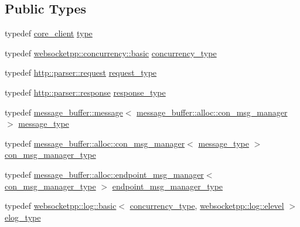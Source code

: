 \subsection*{Public Types}
\begin{DoxyCompactItemize}
\item 
typedef \hyperlink{structwebsocketpp_1_1config_1_1core__client}{core\+\_\+client} \hyperlink{structwebsocketpp_1_1config_1_1core__client_a0d7afa0193a253a7afa8b8f3cc914019}{type}
\item 
typedef \hyperlink{classwebsocketpp_1_1concurrency_1_1basic}{websocketpp\+::concurrency\+::basic} \hyperlink{structwebsocketpp_1_1config_1_1core__client_a4efeeb870e648c7405daab92d10fa5d6}{concurrency\+\_\+type}
\item 
typedef \hyperlink{classwebsocketpp_1_1http_1_1parser_1_1request}{http\+::parser\+::request} \hyperlink{structwebsocketpp_1_1config_1_1core__client_a1fd74b16e3add246b1c356f6f14f206b}{request\+\_\+type}
\item 
typedef \hyperlink{classwebsocketpp_1_1http_1_1parser_1_1response}{http\+::parser\+::response} \hyperlink{structwebsocketpp_1_1config_1_1core__client_a5d8d6a90c7f36442a61a615da2ac8dcc}{response\+\_\+type}
\item 
typedef \hyperlink{classwebsocketpp_1_1message__buffer_1_1message}{message\+\_\+buffer\+::message}$<$ \hyperlink{classwebsocketpp_1_1message__buffer_1_1alloc_1_1con__msg__manager}{message\+\_\+buffer\+::alloc\+::con\+\_\+msg\+\_\+manager} $>$ \hyperlink{structwebsocketpp_1_1config_1_1core__client_ae370adc4110d5d6c709167462467b11c}{message\+\_\+type}
\item 
typedef \hyperlink{classwebsocketpp_1_1message__buffer_1_1alloc_1_1con__msg__manager}{message\+\_\+buffer\+::alloc\+::con\+\_\+msg\+\_\+manager}$<$ \hyperlink{structwebsocketpp_1_1config_1_1core__client_ae370adc4110d5d6c709167462467b11c}{message\+\_\+type} $>$ \hyperlink{structwebsocketpp_1_1config_1_1core__client_ae5d0b586e86a2520bdefe60d61849d37}{con\+\_\+msg\+\_\+manager\+\_\+type}
\item 
typedef \hyperlink{classwebsocketpp_1_1message__buffer_1_1alloc_1_1endpoint__msg__manager}{message\+\_\+buffer\+::alloc\+::endpoint\+\_\+msg\+\_\+manager}$<$ \hyperlink{structwebsocketpp_1_1config_1_1core__client_ae5d0b586e86a2520bdefe60d61849d37}{con\+\_\+msg\+\_\+manager\+\_\+type} $>$ \hyperlink{structwebsocketpp_1_1config_1_1core__client_a1ccd94e4f4d1102cdb81b98284ed1166}{endpoint\+\_\+msg\+\_\+manager\+\_\+type}
\item 
typedef \hyperlink{classwebsocketpp_1_1log_1_1basic}{websocketpp\+::log\+::basic}$<$ \hyperlink{structwebsocketpp_1_1config_1_1core__client_a4efeeb870e648c7405daab92d10fa5d6}{concurrency\+\_\+type}, \hyperlink{structwebsocketpp_1_1log_1_1elevel}{websocketpp\+::log\+::elevel} $>$ \hyperlink{structwebsocketpp_1_1config_1_1core__client_a24f1bae9e8a92bf7950153ed39eaffb8}{elog\+\_\+type}

\end{DoxyCompactItemize}

